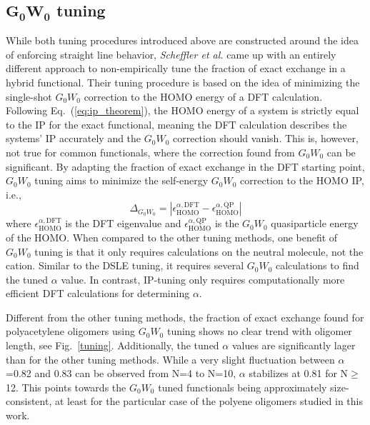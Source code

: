 \documentclass[journal=jctcce,manuscript=article,layout=twocolumn]{achemso}
\begin{document}
\subsection*{$\boldsymbol{G_0W_0}$ tuning}
While both tuning procedures introduced above are constructed around the idea of enforcing straight line behavior, {\sl Scheffler et al.} came up with an entirely different approach to non-empirically tune the 
fraction of exact exchange in a hybrid functional.\cite{phys_rev_b_2013_g0w0_tuning,phys_rev_b_2015_g0w0_tuning_polyacetylene} Their tuning procedure is based on the idea of minimizing the single-shot $G_0W_0$ correction to the HOMO energy of a DFT calculation.
Following Eq.~(\ref{eq:ip_theorem}), the HOMO energy of a system is strictly equal to the IP for the exact functional, meaning the DFT calculation describes the systems' IP accurately and 
the $G_0W_0$ correction should vanish. This is, however, not true for common functionals, where the correction found from $G_0W_0$ can be significant.\cite{phys_rev_b_2010_gw_sc_on_dft,phys_rev_b_2011_gw_ip_organic,phys_rev_b_2015_g0w0_tuning_polyacetylene}
By adapting the fraction of exact exchange in the DFT starting point, $G_0W_0$ tuning aims to minimize the self-energy $G_0W_0$ correction to the HOMO IP, i.e., 
\begin{equation} \label{eq:gw_tuning}
\Delta_{G_0W_0} = |\epsilon^{\alpha,\mathrm{DFT}}_{\mathrm{HOMO}}-\epsilon^{\alpha,\mathrm{QP}}_{\mathrm{HOMO}}|
\end{equation}
where $\epsilon^{\alpha,\mathrm{DFT}}_{\mathrm{HOMO}}$ is the DFT eigenvalue and $\epsilon^{\alpha,\mathrm{QP}}_{\mathrm{HOMO}}$ is the $G_0W_0$ quasiparticle energy of the HOMO. When compared to the other tuning methods, one benefit of $G_0W_0$ tuning is that it only requires calculations on the neutral molecule, not the cation. Similar to the DSLE tuning, it requires several $G_0W_0$ calculations to find the tuned $\alpha$ value. In contrast, IP-tuning only requires computationally more efficient DFT calculations for determining $\alpha$.

Different from the other tuning methods, the fraction of exact exchange found for polyacetylene oligomers using $G_0W_0$ tuning shows no clear trend with oligomer length, see Fig.~\ref{tuning}. Additionally, the tuned $\alpha$ values are significantly lager than for the other tuning methods.
While a very slight fluctuation between $\alpha$=0.82 and 0.83 can be observed from N=4 to N=10, $\alpha$ stabilizes at 0.81 for N$\geq$12. This points towards the $G_0W_0$ tuned functionals being
approximately size-consistent, at least for the particular case of the polyene oligomers studied in this work. 
\end{document}
